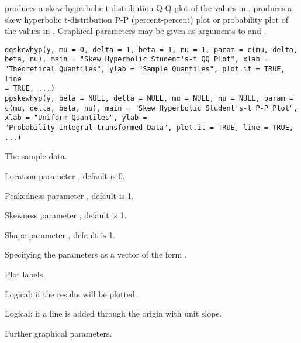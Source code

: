 \begin{Description}\relax
{} produces a skew hyperbolic t-distribution Q-Q plot
of the values in ,  produces a skew
hyperbolic t-distribution P-P (percent-percent) plot or probability
plot of the values in .
Graphical parameters may be given as arguments to  and
.
\end{Description}
\begin{Usage}
\begin{verbatim}
qqskewhyp(y, mu = 0, delta = 1, beta = 1, nu = 1, param = c(mu, delta,
beta, nu), main = "Skew Hyperbolic Student's-t QQ Plot", xlab =
"Theoretical Quantiles", ylab = "Sample Quantiles", plot.it = TRUE, line
= TRUE, ...)
ppskewhyp(y, beta = NULL, delta = NULL, mu = NULL, nu = NULL, param =
c(mu, delta, beta, nu), main = "Skew Hyperbolic Student's-t P-P Plot",
xlab = "Uniform Quantiles", ylab =
"Probability-integral-transformed Data", plot.it = TRUE, line = TRUE, ...)

\end{verbatim}
\end{Usage}
\begin{Arguments}
\begin{ldescription}
\item[\code{y}] The sample data.
\item[\code{mu}] Location parameter \eqn{\mu}{}, default is 0.
\item[\code{delta}] Peakedness parameter \eqn{\delta}{}, default is 1.
\item[\code{beta}] Skewness parameter \eqn{\beta}{}, default is 1.
\item[\code{nu}] Shape parameter \eqn{\nu}{}, default is 1.
\item[\code{param}] Specifying the parameters as a vector of the form
.
\item[\code{main,xlab,ylab}] Plot labels.
\item[\code{plot.it}] Logical; if  the results will be plotted.
\item[\code{line}] Logical; if  a line is added through the
origin with unit slope.
\item[\code{...}] Further graphical parameters.
\end{ldescription}
\end{Arguments}

